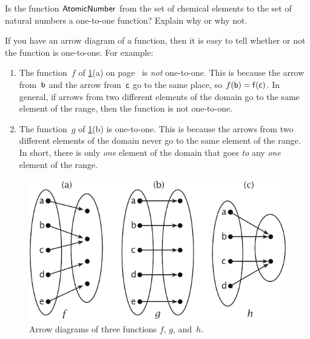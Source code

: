 \begin{exercise}{}
Is the function $\sf{Atomic Number}$ from the set of chemical elements to the set of natural numbers a one-to-one function?  Explain why or why not.
\end{exercise}

\begin{rem}
If you have an arrow diagram of a function, then it is easy to tell whether or not the function is one-to-one. For example:

\begin{enumerate}
\item The function~$f$ of \ref{arrow11}(a) on page~\pageref{arrow11} is \emph{not} one-to-one. This is because the arrow from~$\sf{b}$ and the arrow from~$\sf{c}$ go to the same place, so $f(\sf{b}) = f(\sf{c})$. In general, if arrows from two different elements of the domain go to the same element of the range, then the function is not one-to-one. 
\item The function~$g$ of \ref{arrow11}(b) is one-to-one. This is because the arrows from two different elements of the domain never go to the same element of the range.  In short, there is only \emph{one} element of the domain that goes \emph{to} any \emph{one} element of the range.  
\end{enumerate}
\end{rem}
\begin{figure}[h]
\includegraphics{images/arrow11.pdf}
\caption{Arrow diagrams of three functions $f$, $g$, and~$h$.}
\label{arrow11}
\end{figure}

